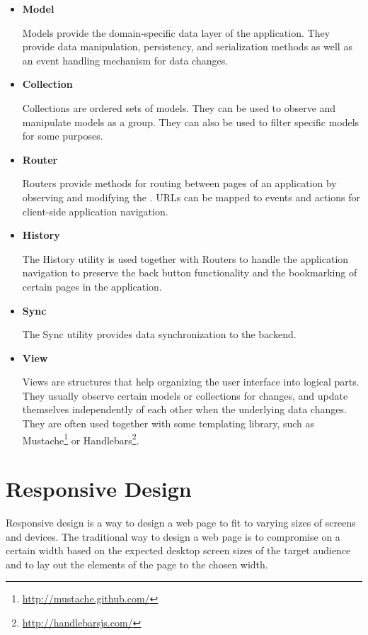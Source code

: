 \begin{itemize}
\item \textbf{Model}

  Models provide the domain-specific data layer of the
  application. They provide data manipulation, persistency, and
  serialization methods as well as an event handling mechanism for
  data changes.

\item \textbf{Collection}

  Collections are ordered sets of models. They can be used to observe
  and manipulate models as a group. They can also be used to filter
  specific models for some purposes.

\item \textbf{Router}

  Routers provide methods for routing between pages of an application
  by observing and modifying the . URLs can be mapped to
  events and actions for client-side application navigation.

\item \textbf{History}

  The History utility is used together with Routers to handle the
  application navigation to preserve the back button functionality and
  the bookmarking of certain pages in the application.

\item \textbf{Sync}

  The Sync utility provides data synchronization to the backend.

\item \textbf{View}

  Views are structures that help organizing the user interface into
  logical parts. They usually observe certain models or collections
  for changes, and update themselves independently of each other when
  the underlying data changes. They are often used together with some
  templating library, such as
  Mustache\footnote{\url{http://mustache.github.com/}} or
  Handlebars\footnote{\url{http://handlebarsjs.com/}}.

\end{itemize}

\section{Responsive Design}

Responsive design is a way to design a web page to fit to varying
sizes of screens and devices. The traditional way to design a web page
is to compromise on a certain width based on the expected desktop
screen sizes of the target audience and to lay out the elements of the
page to the chosen width.

